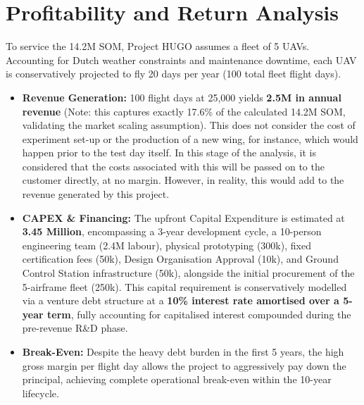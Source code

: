 \section{Profitability and Return Analysis}
\label{sec:profitability}

To service the \texteuro{}14.2M SOM, Project HUGO assumes a fleet of 5 UAVs. Accounting for Dutch weather constraints and maintenance downtime, each UAV is conservatively projected to fly 20 days per year (100 total fleet flight days).

\begin{itemize}
    \item \textbf{Revenue Generation:} 100 flight days at \texteuro{}25,000 yields \textbf{\texteuro{}2.5M in annual revenue} (Note: this captures exactly 17.6\% of the calculated \texteuro{}14.2M SOM, validating the market scaling assumption). This does not consider the cost of experiment set-up or the production of a new wing, for instance, which would happen prior to the test day itself. In this stage of the analysis, it is considered that the costs associated with this will be passed on to the customer directly, at no margin. However, in reality, this would add to the revenue generated by this project.

    \item \textbf{CAPEX \& Financing:} The upfront Capital Expenditure is estimated at \textbf{\texteuro{}3.45 Million}, encompassing a 3-year development cycle, a 10-person engineering team (\texteuro{}2.4M labour), physical prototyping (\texteuro{}300k), fixed certification fees (\texteuro{}50k), Design Organisation Approval (\texteuro{}10k), and Ground Control Station infrastructure (\texteuro{}50k), alongside the initial procurement of the 5-airframe fleet (\texteuro{}250k). This capital requirement is conservatively modelled via a venture debt structure at a \textbf{10\% interest rate amortised over a 5-year term}, fully accounting for capitalised interest compounded during the pre-revenue R\&D phase.

    \item \textbf{Break-Even:} Despite the heavy debt burden in the first 5 years, the high gross margin per flight day allows the project to aggressively pay down the principal, achieving complete operational break-even within the 10-year lifecycle.
\end{itemize}



